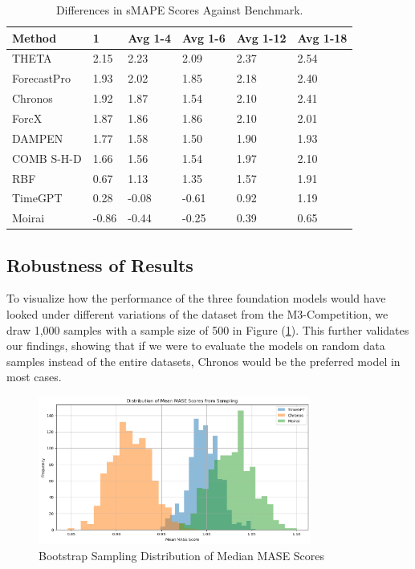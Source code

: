 \documentclass[12pt,a4paper]{article}
\begin{document}
\begin{table}[h!tbp]
  \centering
  \caption{Differences in sMAPE Scores Against Benchmark.}
  \label{smape_scores_table}
  \begin{tabular}{llllll}
  \hline
  \textbf{Method} & \textbf{1} & \textbf{Avg 1-4} & \textbf{Avg 1-6} & \textbf{Avg 1-12} & \textbf{Avg 1-18} \\ \hline
  THETA & 2.15 & 2.23 & 2.09 & 2.37 & 2.54 \\
  ForecastPro & 1.93 & 2.02 & 1.85 & 2.18 & 2.40 \\
  Chronos & 1.92 & 1.87 & 1.54 & 2.10 & 2.41 \\
  ForcX & 1.87 & 1.86 & 1.86 & 2.10 & 2.01 \\
  DAMPEN & 1.77 & 1.58 & 1.50 & 1.90 & 1.93 \\
  COMB S-H-D & 1.66 & 1.56 & 1.54 & 1.97 & 2.10 \\
  RBF & 0.67 & 1.13 & 1.35 & 1.57 & 1.91 \\
  TimeGPT & 0.28 & -0.08 & -0.61 & 0.92 & 1.19 \\
  Moirai & -0.86 & -0.44 & -0.25 & 0.39 & 0.65 \\ \hline
  \end{tabular}
\end{table}

\subsection{Robustness of Results} \label{robustness}

To visualize how the performance of the three foundation models would have looked under different variations of the dataset from the M3-Competition, we draw 1,000 samples with a sample size of 500 in Figure (\ref{mase_sampling_distribution}). This further validates our findings, showing that if we were to evaluate the models on random data samples instead of the entire datasets, Chronos would be the preferred model in most cases.

\begin{figure}[htbp]
  \centering
  \includegraphics[width=0.8\textwidth]{real_bootstrap_sampling.png}
  \caption{Bootstrap Sampling Distribution of Median MASE Scores}
  \label{mase_sampling_distribution}
\end{figure}
\end{document}
